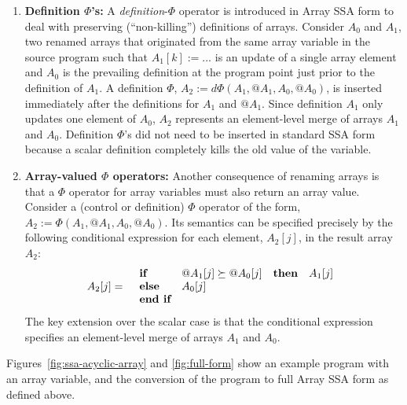 \begin{enumerate}
\item {\bf Definition $\Phi$'s:}
\label{def:phi}
A  {\it definition}-$\Phi$ operator is 
introduced in Array SSA form to deal with preserving (``non-killing'') definitions
of arrays.  Consider $A_0$ and $A_1$, two renamed 
arrays that originated from the same array variable in the source program
such that $A_1[k] := \ldots$
is an update of a single array element
and $A_0$ is the prevailing definition at the program point just
prior to the definition of $A_1$.
A definition $\Phi$, $A_2 := d\Phi(A_1, @A_1, A_0, @A_0)$,
is inserted immediately after the definitions for $A_1$ and $@A_1$.
Since definition $A_1$ only updates one element of $A_0$, $A_2$ represents
an element-level merge of arrays $A_1$ and $A_0$.
Definition $\Phi$'s did not need to be
inserted in standard SSA form because a scalar definition completely kills the old value of
the variable.  


\item {\bf Array-valued  $\Phi$ operators:}
\label{array:phi}
Another consequence of renaming arrays is that
a $\Phi$ operator
for array variables must also return an
array value.  Consider a (control or definition) $\Phi$ operator of
the form, $A_2 := \Phi(A_1, @A_1, A_0, @A_0)$. Its semantics can be specified precisely
by the following conditional expression
for each element, $A_2[j]$, in the result array $A_2$:
\begin{eqnarray}
A_2[j] & = &
  \begin{array}{llll}
\mbox{\bf if} & @A_1[j] \succeq @A_0[j] & \textbf{then} & A_1[j] \\
\mbox{\bf else} & A_0[j] \\
\mbox{\bf end if} \label{eqn:cond-expr}
  \end{array}
\end{eqnarray}
The key extension over the scalar case is that the conditional expression
specifies an element-level merge of arrays $A_1$ and $A_0$.
\end{enumerate}





Figures~\ref{fig:ssa-acyclic-array} and \ref{fig:full-form}
show an example program with an
array variable, and the conversion of the program to full Array SSA form as
defined above.

